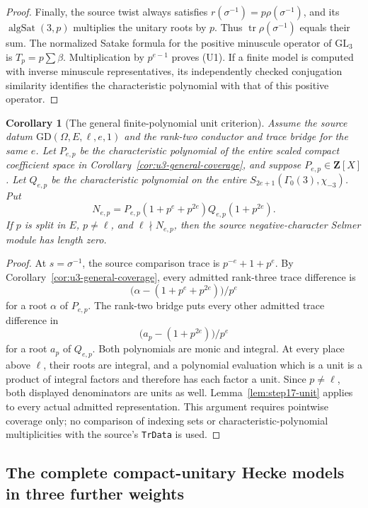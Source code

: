 \documentclass[11pt,a4paper]{article}
\newtheorem{corollary}[theorem]{Corollary}
\theoremstyle{definition}
\begin{document}
\begin{proof}
Finally, the source twist always satisfies
$r(\sigma^{-1})=p\rho(\sigma^{-1})$, and its
$\operatorname{algSat}(3,p)$ multiplies the unitary roots by $p$.
Thus $\operatorname{tr}\rho(\sigma^{-1})$ equals their sum.
The normalized Satake formula for the positive minuscule operator of
$\mathrm{GL}_3$ is $T_p=p\sum\beta$.
Multiplication by $p^{e-1}$ proves (U1).
If a finite model is computed with inverse minuscule representatives,
its independently checked conjugation similarity identifies the
characteristic polynomial with that of this positive operator.
\end{proof}

\begin{corollary}[The general finite-polynomial unit criterion]
\label{cor:general-hecke-unit}
Assume the source datum $\mathrm{GD}(\Omega,E,\ell,e,1)$ and the
rank-two conductor and trace bridge for the same $e$.
Let $P_{e,p}$ be the characteristic polynomial of the entire scaled
compact coefficient space in Corollary~\ref{cor:u3-general-coverage},
and suppose $P_{e,p}\in\mathbf Z[X]$.
Let $Q_{e,p}$ be the characteristic polynomial on the entire
$S_{2e+1}(\Gamma_0(3),\chi_{-3})$.
Put
\[
 N_{e,p}=P_{e,p}(1+p^e+p^{2e})Q_{e,p}(1+p^{2e}).
\]
If $p$ is split in $E$, $p\ne\ell$, and $\ell\nmid N_{e,p}$, then the
source negative-character Selmer module has length zero.
\end{corollary}

\begin{proof}
At $s=\sigma^{-1}$, the source comparison trace is
$p^{-e}+1+p^e$.
By Corollary~\ref{cor:u3-general-coverage}, every admitted rank-three
trace difference is
\[
 \bigl(\alpha-(1+p^e+p^{2e})\bigr)/p^e
\]
for a root $\alpha$ of $P_{e,p}$.
The rank-two bridge puts every other admitted trace difference in
\[
 \bigl(a_p-(1+p^{2e})\bigr)/p^e
\]
for a root $a_p$ of $Q_{e,p}$.
Both polynomials are monic and integral. At every place above $\ell$,
their roots are integral, and a polynomial evaluation which is a unit
is a product of integral factors and therefore has each factor a unit.
Since $p\ne\ell$, both displayed denominators are units as well.
Lemma~\ref{lem:step17-unit} applies to every actual admitted
representation. This argument requires pointwise coverage only; no
comparison of indexing sets or characteristic-polynomial
multiplicities with the source's \texttt{TrData} is used.
\end{proof}

\subsection{The complete compact-unitary Hecke models in three further weights}
\label{sec:u3-general-harmonics}
\end{document}
